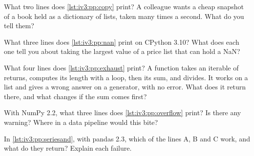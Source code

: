 \begin{question}\label{iq:iv3:python-and-pandas:5}
What two lines does \cref{lst:iv3:pp:copy} print? A colleague wants a cheap snapshot of a book held as a dictionary of lists, taken many times a second. What do you tell them?
\label{lst:iv3:pp:copy}
\end{question}

\begin{question}\label{iq:iv3:python-and-pandas:6}
What three lines does \cref{lst:iv3:pp:nan} print on CPython 3.10? What does each one tell you about taking the largest value of a price list that can hold a NaN?
\label{lst:iv3:pp:nan}
\end{question}

\begin{question}\label{iq:iv3:python-and-pandas:7}
What four lines does \cref{lst:iv3:pp:exhaust} print? A function takes an iterable of returns, computes its length with a loop, then its sum, and divides. It works on a list and gives a wrong answer on a generator, with no error. What does it return there, and what changes if the sum comes first?
\label{lst:iv3:pp:exhaust}
\end{question}

\begin{question}\label{iq:iv3:python-and-pandas:8}
With NumPy 2.2, what three lines does \cref{lst:iv3:pp:overflow} print? Is there any warning? Where in a data pipeline would this bite?
\label{lst:iv3:pp:overflow}
\end{question}

\begin{question}\label{iq:iv3:python-and-pandas:9}
In \cref{lst:iv3:pp:seriesand}, with pandas 2.3, which of the lines A, B and C work, and what do they return? Explain each failure.
\label{lst:iv3:pp:seriesand}
\end{question}

